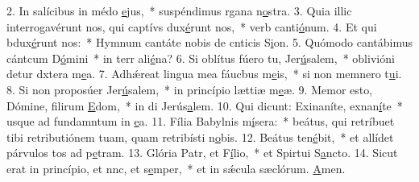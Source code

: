 2. In salícibus in médo \uline{e}jus,~* suspéndimus rgana n\uline{o}stra.
3. Quia illic interrogavérunt nos, qui captívs dux\uline{é}runt nos,~* verb canti\uline{ó}num.
4. Et qui bdux\uline{é}runt nos:~* Hymnum cantáte nobis de cnticis S\uline{i}on.
5. Quómodo cantábimus cántcum D\uline{ó}mini~* in terr ali\uline{é}na?
6. Si oblítus fúero tu, Jer\uline{ú}salem,~* oblivióni detur dxtera m\uline{e}a.
7. Adhǽreat lingua mea fáucbus m\uline{e}is,~* si non memnero t\uline{u}i.
8. Si non proposúer Jer\uline{ú}salem,~* in princípio lættiæ m\uline{e}æ.
9. Memor esto, Dómine, filirum \uline{E}dom,~* in di Jerús\uline{a}lem.
10. Qui dicunt: Exinaníte, exnan\uline{í}te~* usque ad fundamntum in \uline{e}a.
11. Fília Babylnis m\uline{í}sera:~* beátus, qui retríbuet tibi retributiónem tuam, quam retribísti n\uline{o}bis.
12. Beátus  ten\uline{é}bit,~* et allídet párvulos tos ad p\uline{e}tram.
13. Glória Patr, et F\uline{í}lio,~* et Spirtui S\uline{a}ncto.
14. Sicut erat in princípio, et nnc, et s\uline{e}mper,~* et in sǽcula sæclórum. \uline{A}men.
